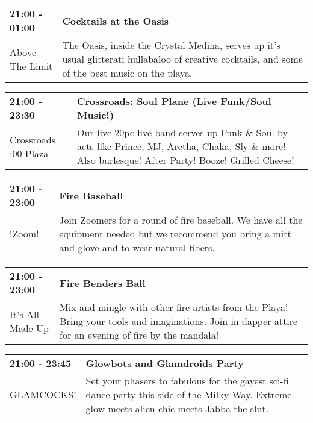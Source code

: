 \begin{tabular}{ p{1in} p{2.2in} }
    \textbf{21:00 - 01:00} & \textbf{Cocktails at the Oasis} \\
    Above The Limit \newline  & The Oasis, inside the Crystal Medina, serves up it's usual glitterati hullabaloo of creative cocktails, and some of the best music on the playa. \\
    \hline 
\end{tabular}
    
\begin{tabular}{ p{1in} p{2.2in} }
    \textbf{21:00 - 23:30} & \textbf{Crossroads: Soul Plane (Live Funk/Soul Music!)} \\
    Crossroads \newline 9:00 Plaza & Our live 20pc live band serves up Funk \& Soul by acts like Prince, MJ, Aretha, Chaka, Sly \& more! Also burlesque! After Party! Booze! Grilled Cheese! \\
    \hline 
\end{tabular}
    
\begin{tabular}{ p{1in} p{2.2in} }
    \textbf{21:00 - 23:00} & \textbf{Fire Baseball} \\
    !Zoom! \newline  & Join Zoomers for a round of fire baseball.  We have all the equipment needed but we recommend you bring a mitt and glove and to wear natural fibers. \\
    \hline 
\end{tabular}
    
\begin{tabular}{ p{1in} p{2.2in} }
    \textbf{21:00 - 23:00} & \textbf{Fire Benders Ball} \\
    It's All Made Up \newline  & Mix and mingle with other fire artists from the Playa! Bring your tools and imaginations. Join in dapper attire for an evening of fire by the mandala! \\
    \hline 
\end{tabular}
    
\begin{tabular}{ p{1in} p{2.2in} }
    \textbf{21:00 - 23:45} & \textbf{Glowbots and Glamdroids Party} \\
    GLAMCOCKS! \newline  & Set your phasers to fabulous for the gayest sci-fi dance party this side of the Milky Way. Extreme glow meets alien-chic meets Jabba-the-slut. \\
    \hline 
\end{tabular}
    
